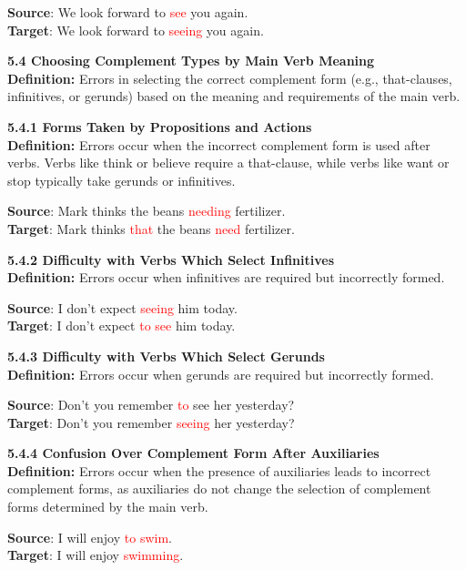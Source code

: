 \begin{tcolorbox}[breakable]
\textbf{Source}: We look forward to \textcolor{red}{see} you again. \\
\textbf{Target}: We look forward to \textcolor{red}{seeing} you again.


\noindent \textbf{5.4 Choosing Complement Types by Main Verb Meaning}\\
\textbf{Definition:} Errors in selecting the correct complement form (e.g., that-clauses, infinitives, or gerunds) based on the meaning and requirements of the main verb.

\noindent \textbf{5.4.1 Forms Taken by Propositions and Actions}\\
\textbf{Definition:} Errors occur when the incorrect complement form is used after verbs. Verbs like think or believe require a that-clause, while verbs like want or stop typically take gerunds or infinitives.


\textbf{Source}: Mark thinks the beans \textcolor{red}{needing} fertilizer. \\
\textbf{Target}: Mark thinks \textcolor{red}{that} the beans \textcolor{red}{need} fertilizer.


\noindent \textbf{5.4.2 Difficulty with Verbs Which Select Infinitives}\\
\textbf{Definition:} Errors occur when infinitives are required but incorrectly formed.


\textbf{Source}: I don’t expect \textcolor{red}{seeing} him today. \\
\textbf{Target}: I don’t expect \textcolor{red}{to see} him today.


\noindent \textbf{5.4.3 Difficulty with Verbs Which Select Gerunds}\\
\textbf{Definition:} Errors occur when gerunds are required but incorrectly formed.


\textbf{Source}: Don’t you remember \textcolor{red}{to} see her yesterday? \\
\textbf{Target}: Don't you remember \textcolor{red}{seeing} her yesterday?


\noindent \textbf{5.4.4 Confusion Over Complement Form After Auxiliaries}\\
\textbf{Definition:} Errors occur when the presence of auxiliaries leads to incorrect complement forms, as auxiliaries do not change the selection of complement forms determined by the main verb.


\textbf{Source}: I will enjoy \textcolor{red}{to swim}. \\
\textbf{Target}: I will enjoy \textcolor{red}{swimming}.



\end{tcolorbox}
